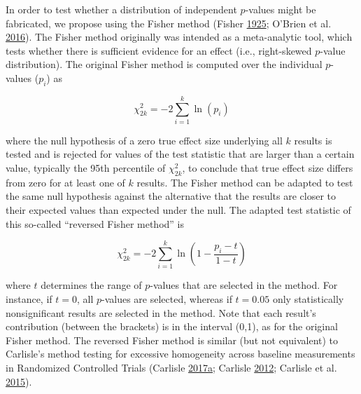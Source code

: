 \documentclass[a5paper]{book}
\begin{document}
In order to test whether a distribution of independent \(p\)-values
might be fabricated, we propose using the Fisher method (Fisher
\protect\hyperlink{ref-Fisher1925-jl}{1925}; O'Brien et al.
\protect\hyperlink{ref-doi:10.1186ux2fs41073-016-0012-9}{2016}). The
Fisher method originally was intended as a meta-analytic tool, which
tests whether there is sufficient evidence for an effect (i.e.,
right-skewed \(p\)-value distribution). The original Fisher method is
computed over the individual \(p\)-values (\(p_i\)) as

\begin{equation}
\chi^2_{2k}=-2\sum\limits^k_{i=1}\ln(p_i)
\label{eq:fisher}
\end{equation}

where the null hypothesis of a zero true effect size underlying all
\(k\) results is tested and is rejected for values of the test statistic
that are larger than a certain value, typically the 95th percentile of
\(\chi^2_{2k}\), to conclude that true effect size differs from zero for
at least one of \(k\) results. The Fisher method can be adapted to test
the same null hypothesis against the alternative that the results are
closer to their expected values than expected under the null. The
adapted test statistic of this so-called \enquote{reversed Fisher
method} is

\begin{equation}
\chi^2_{2k}=-2\sum\limits^k_{i=1}\ln(1-\frac{p_i-t}{1-t})
\label{eq:revfisher}
\end{equation}

where \(t\) determines the range of \(p\)-values that are selected in
the method. For instance, if \(t=0\), all \(p\)-values are selected,
whereas if \(t=0.05\) only statistically nonsignificant results are
selected in the method. Note that each result's contribution (between
the brackets) is in the interval (0,1), as for the original Fisher
method. The reversed Fisher method is similar (but not equivalent) to
Carlisle's method testing for excessive homogeneity across baseline
measurements in Randomized Controlled Trials (Carlisle
\protect\hyperlink{ref-doi:10.1111ux2fanae.13938}{2017}\protect\hyperlink{ref-doi:10.1111ux2fanae.13938}{a};
Carlisle
\protect\hyperlink{ref-doi:10.1111ux2fj.1365-2044.2012.07128.x}{2012};
Carlisle et al.
\protect\hyperlink{ref-doi:10.1111ux2fanae.13126}{2015}).
\end{document}
